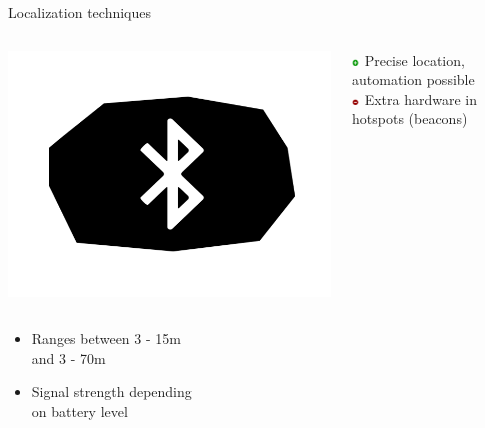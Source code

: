 \documentclass[11pt]{beamer}
\begin{document}
\begin{frame}{Localization techniques}

  \begin{columns}

    \begin{column}{0.2\textwidth}
      \includegraphics[width=\textwidth]{beacon-symbol}
    \end{column}

    \hfill

    \begin{column}{0.8\textwidth}

      \includegraphics[width=0.05\textwidth]{plus} Precise location, automation possible\\
      \includegraphics[width=0.05\textwidth]{minus} Extra hardware in hotspots (beacons)

    \end{column}

  \end{columns}

  \begin{columns}

    \begin{column}{0.65\textwidth}

      \begin{itemize}
        \setlength{\itemsep}{1.5ex}
        \item Ranges between 3 - 15m\\and 3 - 70m
        \item Signal strength depending\\on battery level
      \end{itemize}


\end{column}
\end{columns}
\end{frame}
\end{document}
